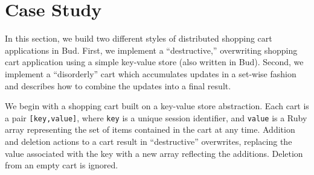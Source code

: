 \section{Case Study}
\label{sec:case}

In this section, we build two different styles of distributed shopping cart
applications in Bud.  First, we implement a ``destructive,'' overwriting
shopping cart application using a simple key-value store (also written in Bud).
Second, we implement a ``disorderly'' cart which accumulates updates in a 
set-wise fashion and describes how to combine the updates into a final result.

We begin with a shopping cart built on a key-value store abstraction.  Each
cart is a pair \texttt{[key,value]}, where \texttt{key} is a unique session
identifier, and \texttt{value} is a Ruby array representing the set of items
contained in the cart at any time.  Addition and deletion actions to a cart
result in ``destructive'' overwrites, replacing the value associated with the
key with a new array reflecting the additions.  Deletion from an empty cart
 is ignored. 

